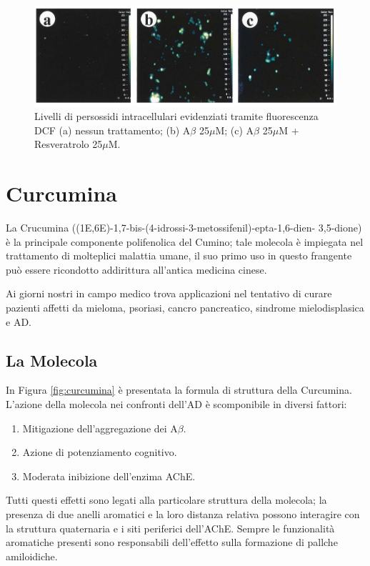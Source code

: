 \documentclass[a4paper, 12pt]{article}
\begin{document}
\begin{figure}[H]
	\centering
	\includegraphics[width=\linewidth]{immagini/roi_resveratrolo.png}
	\caption{Livelli di persossidi intracellulari evidenziati tramite fluorescenza DCF (a) nessun trattamento; (b) A$\beta$ 25$\mu$M; (c) A$\beta$ 25$\mu$M + Resveratrolo 25$\mu$M.}
	\label{fig:roi_resveratrolo}
\end{figure}

\section{Curcumina}
\label{sec:curc}
La Crucumina ((1E,6E)-1,7-bis-(4-idrossi-3-metossifenil)-epta-1,6-dien- 3,5-dione) è la principale componente polifenolica del Cumino; tale molecola è impiegata nel trattamento di molteplici malattia umane, il suo primo uso in questo frangente può essere ricondotto addirittura all'antica medicina cinese.

Ai giorni nostri in campo medico trova applicazioni nel tentativo di curare pazienti affetti da mieloma, psoriasi, cancro pancreatico, sindrome mielodisplasica e AD.

\subsection{La Molecola}
In Figura \ref{fig:curcumina} è presentata la formula di struttura della Curcumina. L'azione della molecola nei confronti dell'AD è scomponibile in diversi fattori:

\begin{enumerate}
	\item Mitigazione dell'aggregazione dei A$\beta$.
	\item Azione di potenziamento cognitivo.
	\item Moderata inibizione dell'enzima AChE.
\end{enumerate}

Tutti questi effetti sono legati alla particolare struttura della molecola; la presenza di due anelli aromatici e la loro distanza relativa possono interagire con la struttura quaternaria  e i siti periferici dell'AChE. Sempre le funzionalità aromatiche presenti sono responsabili dell'effetto sulla formazione di pallche amiloidiche.
\end{document}
